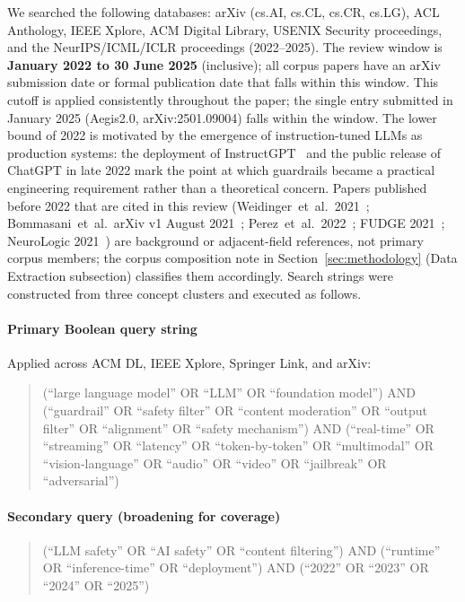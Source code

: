 We searched the following databases: arXiv (cs.AI, cs.CL, cs.CR, cs.LG), ACL
Anthology, IEEE Xplore, ACM Digital Library, USENIX Security proceedings, and
the NeurIPS/ICML/ICLR proceedings (2022--2025).
The review window is \textbf{January 2022 to 30 June 2025} (inclusive); all
corpus papers have an arXiv submission date or formal publication date that falls
within this window.
This cutoff is applied consistently throughout the paper; the single entry
submitted in January 2025 (Aegis2.0, arXiv:2501.09004) falls within the window.
The lower bound of 2022 is motivated by the emergence of instruction-tuned LLMs
as production systems: the deployment of InstructGPT~\cite{ouyang2022training}
and the public release of ChatGPT in late 2022 mark the point at which guardrails
became a practical engineering requirement rather than a theoretical concern.
Papers published before 2022 that are cited in this review (Weidinger~et~al.\
2021~\cite{weidinger2021ethical}; Bommasani~et~al.\ arXiv v1 August
2021~\cite{bommasani2022opportunities}; Perez~et~al.\ 2022~\cite{perez2022red};
FUDGE 2021~\cite{yang2021fudge}; NeuroLogic 2021~\cite{lu2021neurologic}) are
background or adjacent-field references, not primary corpus members; the corpus
composition note in Section~\ref{sec:methodology} (Data Extraction subsection)
classifies them accordingly.
Search strings were constructed from three concept clusters and executed as follows.

\paragraph{Primary Boolean query string}
Applied across ACM DL, IEEE Xplore, Springer Link, and arXiv:
\begin{quote}\footnotesize\sloppy
(``large language model'' OR ``LLM'' OR ``foundation model'')
AND (``guardrail'' OR ``safety filter'' OR ``content moderation'' OR ``output filter'' OR ``alignment'' OR ``safety mechanism'')
AND (``real-time'' OR ``streaming'' OR ``latency'' OR ``token-by-token'' OR ``multimodal'' OR ``vision-language'' OR ``audio'' OR ``video'' OR ``jailbreak'' OR ``adversarial'')
\end{quote}

\paragraph{Secondary query (broadening for coverage)}
\begin{quote}\footnotesize\sloppy
(``LLM safety'' OR ``AI safety'' OR ``content filtering'')
AND (``runtime'' OR ``inference-time'' OR ``deployment'')
AND (``2022'' OR ``2023'' OR ``2024'' OR ``2025'')
\end{quote}

